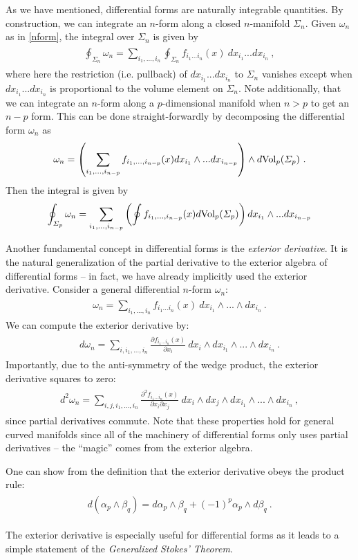 \documentclass[11pt]{article}
\newcommand{\eq}[1]{\begin{align}\begin{split}#1\end{split}\end{align}}
\begin{document}
As we have mentioned, differential forms  are naturally integrable quantities. By construction, we can integrate an $n$-form along  a closed $n$-manifold $\Sigma_n$. Given $\omega_n$ as in \eqref{nform}, the integral over $\Sigma_n$ is given by 
\eq{ 
\oint_{\Sigma_n} \omega_n= \sum_{i_1,...,i_n}\oint_{\Sigma_n} f_{i_1...i_n}(x)~dx_{i_1} ... dx_{i_n}~,
}
where here the restriction (i.e. pullback) of $dx_{i_1}...dx_{i_n}$ to $\Sigma_n$ vanishes except when $dx_{i_1}...dx_{i_n}$ is proportional to the volume element on $\Sigma_n$. 
Note additionally, that we can integrate an $n$-form along a $p$-dimensional manifold when $n>p$ to get an $n-p$ form. This can be done straight-forwardly by decomposing the differential form $\omega_n$ as 
\eq{
\omega_n=\left(\sum_{i_1,...,i_{n-p}}f_{i_1,...,i_{n-p}}(x)dx_{i_1}\wedge...dx_{i_{n-p}}\right)\wedge d{\rm Vol}_p(\Sigma_p)~.
}
Then the integral is given by 
\eq{
 \oint_{\Sigma_p}\omega_n=\sum_{i_1,...,i_{n-p}}\left(\oint f_{i_1,...,i_{n-p}}(x)d{\rm Vol}_p(\Sigma_p)\right)dx_{i_1}\wedge...dx_{i_{n-p}}
}




\bigskip
Another fundamental concept in differential forms is the \emph{exterior derivative}. It is the natural generalization of the partial derivative to the exterior algebra of differential forms -- in fact, we have already implicitly used the exterior derivative. Consider a general differential $n$-form $\omega_n$:
\eq{
\omega_n=\sum_{i_1,...,i_n}f_{i_1...i_n}(x)~dx_{i_1}\wedge ...\wedge dx_{i_n}~. 
}
We can compute the exterior derivative by:
\eq{
d\omega_n=\sum_{i,i_1,...,i_n}\frac{\partial f_{i_1...i_n}(x)}{\partial x_i}~dx_i\wedge dx_{i_1}\wedge ...\wedge dx_{i_n}~. 
}
Importantly, due to the anti-symmetry of the wedge product, the exterior derivative squares to zero:
\eq{
d^2\omega_n=\sum_{i,j,i_1,...,i_n}\frac{\partial^2 f_{i_1...i_n}(x)}{\partial x_i\partial x_j}~dx_i\wedge dx_j\wedge dx_{i_1}\wedge ...\wedge dx_{i_n}~,
}
since partial derivatives commute. Note that these properties hold for general curved manifolds since all of the machinery of differential forms only uses partial derivatives -- the ``magic'' comes from the exterior algebra.  

One can show from the definition that the exterior derivative obeys the product rule:
\eq{\label{extderivproduct}
d(\alpha_p\wedge \beta_q)=d\alpha_p\wedge \beta_q+(-1)^p \alpha_p\wedge d\beta_q~.
}



\bigskip The exterior derivative is especially useful for differential forms as it leads to a simple statement of the \emph{Generalized Stokes' Theorem}. \\
\end{document}
